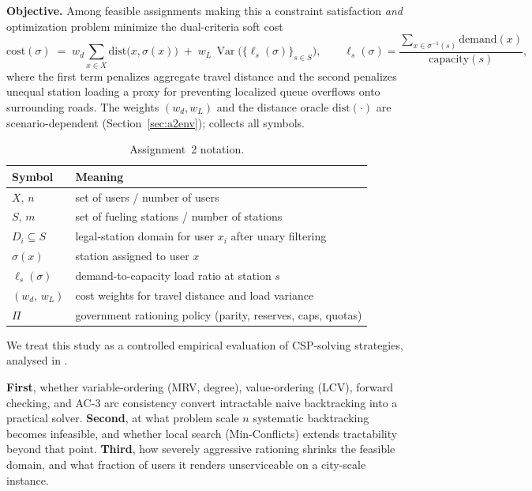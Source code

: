 \documentclass{ai-lab-report}
\begin{document}
\textbf{Objective.} Among feasible assignments making this a constraint satisfaction \emph{and} optimization problem minimize the dual-criteria soft cost
\begin{equation}
\mathrm{cost}(\sigma)\;=\;w_{d}\!\sum_{x\in X}\mathrm{dist}\big(x,\sigma(x)\big)\;+\;w_{L}\,\operatorname{Var}\!\Big(\big\{\ell_s(\sigma)\big\}_{s\in S}\Big),
\qquad
\ell_s(\sigma)=\frac{\sum_{x\in\sigma^{-1}(s)}\!\mathrm{demand}(x)}{\mathrm{capacity}(s)},
\label{eq:cspcost}
\end{equation}
where the first term penalizes aggregate travel distance and the second penalizes unequal station loading a proxy for preventing 
localized queue overflows onto surrounding roads. The weights $(w_d, w_L)$ and the distance oracle $\mathrm{dist}(\cdot)$ are scenario-dependent 
(Section~\ref{sec:a2env});  collects all symbols.

\begin{table}[H]
\centering
\small
\begin{tabularx}{\linewidth}{@{}lX@{}}
\toprule
Symbol & Meaning \\
\midrule
$X,\,n$           & set of users / number of users \\
$S,\,m$           & set of fueling stations / number of stations \\
$D_i \subseteq S$ & legal-station domain for user $x_i$ after unary filtering \\
$\sigma(x)$       & station assigned to user $x$ \\
$\ell_s(\sigma)$  & demand-to-capacity load ratio at station $s$ \\
$(w_d,\,w_L)$     & cost weights for travel distance and load variance \\
$\Pi$             & government rationing policy (parity, reserves, caps, quotas) \\
\bottomrule
\end{tabularx}
\caption{Assignment~2 notation.}
\label{tab:a2notation}
\end{table}

We treat this study as a controlled empirical evaluation of CSP-solving strategies, analysed in . 

\textbf{First}, whether variable-ordering (MRV, degree), value-ordering (LCV), forward checking, and AC-3 arc consistency convert intractable naive 
backtracking into a practical solver. 
\textbf{Second}, at what problem scale $n$ systematic backtracking becomes infeasible, and whether local search (Min-Conflicts) extends 
tractability beyond that point. 
\textbf{Third}, how severely aggressive rationing shrinks the feasible domain, and what fraction of users it renders unserviceable on a city-scale instance.
\end{document}
